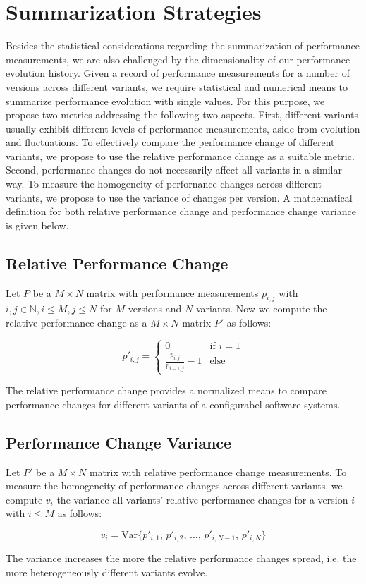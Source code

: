 \section{Summarization Strategies}\label{sec:summarization}
Besides the statistical considerations regarding the summarization of
performance measurements, we are also challenged by the dimensionality of our
performance evolution history. Given a record of performance measurements for a
number of versions across different variants, we require statistical and
numerical means to summarize performance evolution with single values. For this
purpose, we propose two metrics addressing the following two aspects. First,
different variants usually exhibit different levels of performance
measurements, aside from evolution and fluctuations. To effectively compare the
performance change of different variants, we propose to use the relative
performance change as a suitable metric. Second, performance changes do not
necessarily affect all variants in a similar way. To measure the homogeneity of
perfornance changes across different variants, we propose to use the variance
of changes per version. A mathematical definition for both relative performance
change and performance change variance is given below.

\subsection{Relative Performance Change}\label{sec:relativechange}
Let $P$ be a $M \times N$ matrix with performance measurements $p_{i, j}$ with
$i, j \in \mathbb{N}, i \leq M, j \leq N$ for $M$ versions and $N$ variants. Now
we compute the relative performance change as a $M \times N$ matrix $P'$ as
follows:

\begin{equation}
   p'_{i, j} =
   \begin{cases}
     0 & \text{if~} i = 1 \\
     \frac{p_{i, j}}{p_{i-1,j}} - 1 & \text{else} 
   \end{cases}
\end{equation}

The relative performance change provides a normalized means to compare
performance changes for different variants of a configurabel software systems.

\subsection{Performance Change Variance}\label{sec:changevar}
Let $P'$ be a $M \times N$ matrix with relative performance change measurements.
To measure the homogeneity of performance changes across different variants, we
compute $v_i$ the variance all variants' relative performance changes for a
version $i$ with $i \leq M$ as follows:

\begin{equation}
   v_i = \text{Var}\lbrace p'_{i,1},\,p'_{i,2},\,\ldots,\,p'_{i,N-1},\,p'_{i,N}
   \rbrace
\end{equation}

The variance increases the more the relative performance changes spread, i.e.
the more heterogeneously different variants evolve.
